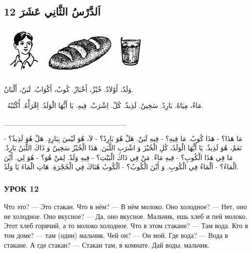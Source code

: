 \documentclass[a5paper]{article}
\begin{document}
\subsection[12 اَلدَّرْسُ الثَّانِي عَشَرَ]{12 اَلدَّرْسُ الثَّانِي عَشَرَ}
\  \includegraphics[width=0.7398in,height=1.0209in]{MuhammadBagauddinlatinized-img019.jpg}   \includegraphics[width=1.5102in,height=1.0311in]{MuhammadBagauddinlatinized-img020.jpg}   \includegraphics[width=0.5835in,height=1.0311in]{MuhammadBagauddinlatinized-img021.jpg} 

وَلَدٌ، أَوْلاَدٌ. خُبْزٌ، أَخْبَازٌ. كُوبٌ، أَكْوَابٌ. لَبَنٌ، أَلْبَانٌ.

\ مَاءٌ، مِيَاهٌ. بَارِدٌ. سَخِينٌ. لَذِيذٌ. كُلْ. اِشْرَبْ. فِيهِ. يَا أَيُّهَا الْوَلَدُ. اِقْرَأْهُ. أُكْتُبْهُ.

\_\_\_\_\_\_\_\_\_\_\_\_\_\_\_\_\_\_\_\_\_\_\_\_ 

مَا هَذَا؟ - هَذَا كُوبٌ. مَا فِيهِ؟ - فِيهِ لَبَنٌ. هَلْ هُوَ بَارِدٌ؟ - لاَ، هُوَ لَيْسَ بِبَارِدٍ. هَلْ هُوَ لَذِيذٌ؟ - نَعَمْ، هُوَ لَذِيذٌ. يَا أَيُّهَا الْوَلَدُ، كُلِ الْخُبْزَ وَ اشْرَبِ اللَّبَنَ. هَذَا الْخُبْزُ سَخِينٌ وَ ذَاكَ اللَّبَنُ بَارِدٌ. مَا فِي هَذَا الْكُوبِ؟ - فِيهِ مَاءٌ. مَنْ فِي ذَاكَ الْبَيْتِ؟ - فِيهِ وَلَدٌ. لِمَنْ هُوَ؟ - هُوَ لِي. أَيْنَ الْمَاءُ؟ - اَلْمَاءُ فِي الْكُوبِ. وَ أَيْنَ الْكُوبُ؟ - اَلْكُوبُ هُنَاكَ فِي الْحُجْرَةِ. هَاتِ الْمَاءَ يَا وَلَدُ.

\subsubsection{УРОК 12}
Что это? — Это стакан. Что в нём? — В нём молоко. Оно холод­ное? — Нет, оно не холодное. Оно вкусное? — Да, оно вкусное. Мальчик, ешь хлеб и пей молоко. Этот хлеб горячий, а то молоко холодное. Что в этом стакане? — Там вода. Кто в том доме? — там (один) мальчик. Чей он? — Он мой. Где вода? — Вода в стакане. А где стакан? — Стакан там, в комнате. Дай воды, мальчик.
\end{document}

